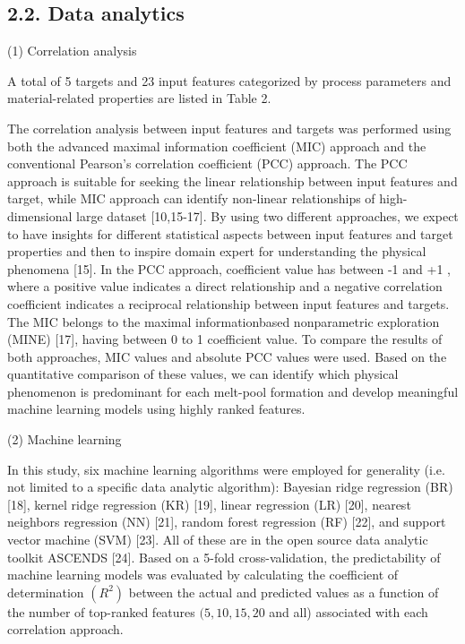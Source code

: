 \documentclass[10pt]{article}
\begin{document}
\subsection*{2.2. Data analytics}
(1) Correlation analysis

A total of 5 targets and 23 input features categorized by process parameters and material-related properties are listed in Table 2.

The correlation analysis between input features and targets was performed using both the advanced maximal information coefficient (MIC) approach and the conventional Pearson's correlation coefficient (PCC) approach. The PCC approach is suitable for seeking the linear relationship between input features and target, while MIC approach can identify non-linear relationships of high-dimensional large dataset [10,15-17]. By using two different approaches, we expect to have insights for different statistical aspects between input features and target properties and then to inspire domain expert for understanding the physical phenomena [15]. In the PCC approach, coefficient value has between -1 and +1 , where a positive value indicates a direct relationship and a negative correlation coefficient indicates a reciprocal relationship between input features and targets. The MIC belongs to the maximal informationbased nonparametric exploration (MINE) [17], having between 0 to 1 coefficient value. To compare the results of both approaches, MIC values and absolute PCC values were used. Based on the quantitative comparison of these values, we can identify which physical phenomenon is predominant for each melt-pool formation and develop meaningful machine learning models using highly ranked features.

(2) Machine learning

In this study, six machine learning algorithms were employed for generality (i.e. not limited to a specific data analytic algorithm): Bayesian ridge regression (BR) [18], kernel ridge regression (KR) [19], linear regression (LR) [20], nearest neighbors regression (NN) [21], random forest regression (RF) [22], and support vector machine (SVM) [23]. All of these are in the open source data analytic toolkit ASCENDS [24]. Based on a 5-fold cross-validation, the predictability of machine learning models was evaluated by calculating the coefficient of determination $\left(R^{2}\right)$ between the actual and predicted values as a function of the number of top-ranked features $(5,10,15,20$ and all) associated with each correlation approach.
\end{document}
